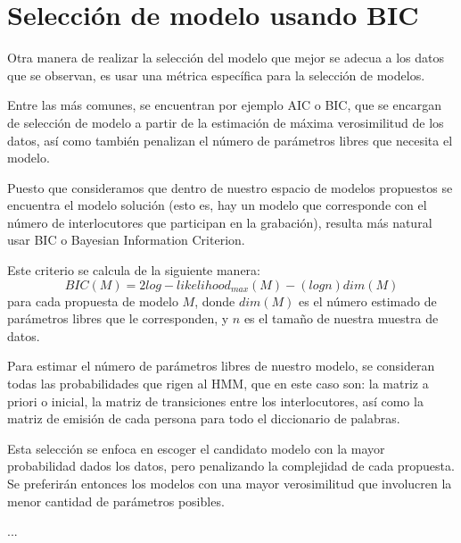 \section{Selección de modelo usando BIC}

\begin{comment} 
Una vez que se tienen los parámetros estimados para cada uno de los modelos correspondientes a las propuestas, se necesita ver cuál es el modelo que mejor se ajusta a los datos.
\end{comment} 

Otra manera de realizar la selección del modelo que mejor se adecua a los datos que se observan, es usar una métrica específica para la selección de modelos.

Entre las más comunes, se encuentran por ejemplo AIC o BIC, que se encargan de selección de modelo a partir de la estimación de máxima verosimilitud de los datos, así como también penalizan el número de parámetros libres que necesita el modelo.

Puesto que consideramos que dentro de nuestro espacio de modelos propuestos se encuentra el modelo solución (esto es, hay un modelo que corresponde con el número de interlocutores que participan en la grabación), resulta más natural usar BIC o Bayesian Information Criterion.

Este criterio se calcula de la siguiente manera: 
\begin{equation}
BIC(M) = 2 log-likelihood_{max}(M) - (log n ) dim(M)
\end{equation}
para cada propuesta de modelo $M$, donde $dim(M)$ es el número estimado de parámetros libres que le corresponden, y $n$ es el tamaño de nuestra muestra de datos.

Para estimar el número de parámetros libres de nuestro modelo, se consideran todas las probabilidades que rigen al HMM, que en este caso son: la matriz a priori o inicial, la matriz de transiciones entre los interlocutores, así como la matriz de emisión de cada persona para todo el diccionario de palabras.

Esta selección se enfoca en escoger el candidato modelo con la mayor probabilidad dados los datos, pero penalizando la complejidad de cada propuesta. Se preferirán entonces los modelos con una mayor verosimilitud que involucren la menor cantidad de parámetros posibles. 

...